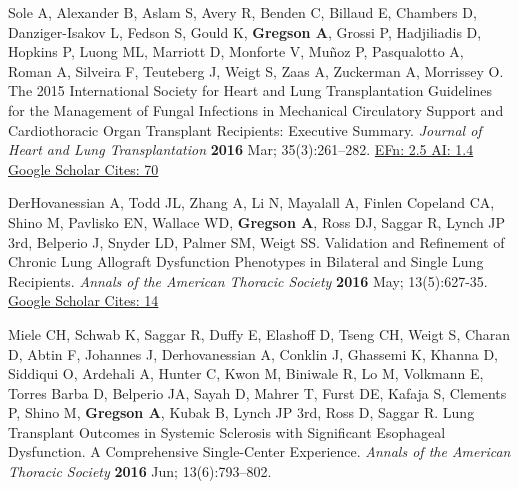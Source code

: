 \documentclass[letterpaper,10pt,sans,dvipsnames,final]{moderncv}%
\begin{document}
\begin{thebibliography}{1}
  \bibitem[30]{} Sole A, Alexander B, Aslam S, Avery R, Benden C, Billaud E, Chambers D, Danziger-Isakov L, Fedson S, Gould K, \textbf{Gregson A}, Grossi P, Hadjiliadis D, Hopkins P, Luong ML, Marriott D, Monforte V, Mu\~{n}oz P, Pasqualotto A, Roman A, Silveira F, Teuteberg J, Weigt S, Zaas A, Zuckerman A, Morrissey O. The 2015 International Society for Heart and Lung Transplantation Guidelines for the Management of Fungal Infections in Mechanical Circulatory Support and Cardiothoracic Organ Transplant Recipients: Executive Summary.  {\color{BrickRed}\textit{Journal of Heart and Lung Transplantation}} \textbf{2016} Mar; 35(3):261--282. \href{http://www.sciencedirect.com/science/article/pii/S1053249816000541}{\aiDoi}
    {\color{NavyBlue} \href{http://www.eigenfactor.org/rankings.php?search=JOURNAL+OF+HEART+AND+LUNG+TRANSPLANTATION&search2=&search3=&searchby=journal}{{\smaller EFn: 2.5 AI: 1.4}}
     \href{https://scholar.google.com/scholar?oi=bibs&hl=en&cites=406115809586476358}{{\smaller Google Scholar Cites: 70}}
    }

  \bibitem[31]{} DerHovanessian A, Todd JL, Zhang A, Li N, Mayalall A, Finlen Copeland CA, Shino M, Pavlisko EN, Wallace WD, \textbf{Gregson A}, Ross DJ, Saggar R, Lynch JP 3rd, Belperio J, Snyder LD, Palmer SM, Weigt SS. Validation and Refinement of Chronic Lung Allograft Dysfunction Phenotypes in Bilateral and Single Lung Recipients. {\color{BrickRed}\textit{Annals of the American Thoracic Society}} \textbf{2016} May; 13(5):627-35. \href{http://www.atsjournals.org/doi/10.1513/AnnalsATS.201510-719OC#.V3wodPEjW5M}{\aiDoi}
    {\color{NavyBlue} \href{https://scholar.google.com/scholar?oi=bibs&hl=en&cites=1415995398663718578}{{\smaller Google Scholar Cites: 14}}
      }

\bibitem[32]{} Miele CH, Schwab K, Saggar R, Duffy E, Elashoff D, Tseng CH, Weigt S, Charan D, Abtin F, Johannes J, Derhovanessian A, Conklin J, Ghassemi K, Khanna D, Siddiqui O, Ardehali A, Hunter C, Kwon M, Biniwale R, Lo M, Volkmann E, Torres Barba D, Belperio JA, Sayah D, Mahrer T, Furst DE, Kafaja S, Clements P, Shino M, \textbf{Gregson A}, Kubak B, Lynch JP 3rd, Ross D, Saggar R. Lung Transplant Outcomes in Systemic Sclerosis with Significant Esophageal Dysfunction. A Comprehensive Single-Center Experience. {\color{BrickRed}\textit{Annals of the American Thoracic Society}} \textbf{2016} Jun; 13(6):793--802. \href{http://www.atsjournals.org/doi/10.1513/AnnalsATS.201512-806OC#.V3wkRvEjW5M}{\aiDoi}


\end{thebibliography}
\end{document}
